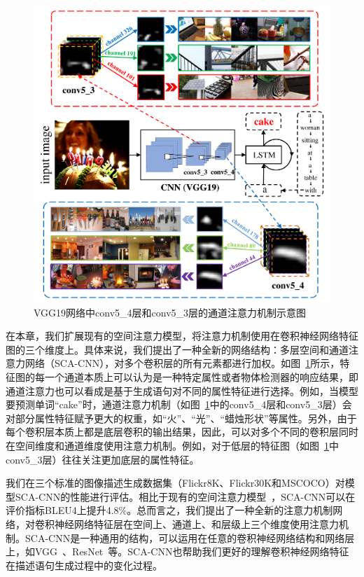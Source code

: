 \begin{figure}[t]
    \centering
    \includegraphics[width=0.9\linewidth]{chapter5/res/motivation.pdf}
    \caption{VGG19网络中conv5\_4层和conv5\_3层的通道注意力机制示意图}
    \label{ch5:fig:motivation}
\end{figure}

在本章，我们扩展现有的空间注意力模型，将注意力机制使用在卷积神经网络特征图的三个维度上。具体来说，我们提出了一种全新的网络结构：多层空间和通道注意力网络（SCA-CNN），对多个卷积层的所有元素都进行加权。如图~\ref{ch5:fig:motivation}所示，特征图的每一个通道本质上可以认为是一种特定属性或者物体检测器的响应结果，即通道注意力也可以看成是基于生成语句对不同的属性特征进行选择。例如，当模型要预测单词“cake”时，通道注意力机制（如图~\ref{ch5:fig:motivation}中的conv5\_4层和conv5\_3层）会对部分属性特征赋予更大的权重，如“火”、“光”、“蜡烛形状”等属性。另外，由于每个卷积层本质上都是底层卷积的输出结果，因此，可以对多个不同的卷积层同时在空间维度和通道维度使用注意力机制。例如，对于低层的特征图（如图~\ref{ch5:fig:motivation}中conv5\_3层）往往关注更加底层的属性特征。

我们在三个标准的图像描述生成数据集（Flickr8K、Flickr30K和MSCOCO）对模型SCA-CNN的性能进行评估。相比于现有的空间注意力模型~\cite{xu2015show}，SCA-CNN可以在评价指标BLEU4上提升4.8\%。总而言之，我们提出了一种全新的注意力机制网络，对卷积神经网络特征层在空间上、通道上、和层级上三个维度使用注意力机制。SCA-CNN是一种通用的结构，可以运用在任意的卷积神经网络结构和网络层上，如VGG~\cite{simonyan2015very}、ResNet~\cite{he2016deep}等。SCA-CNN也帮助我们更好的理解卷积神经网络特征在描述语句生成过程中的变化过程。


